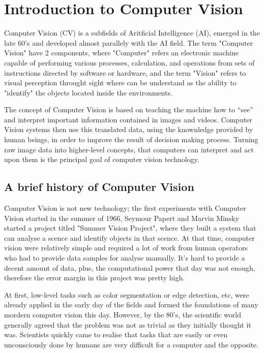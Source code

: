 \documentclass[12pt]{report}
\begin{document}
\newpage

\section{Introduction to Computer Vision}
Computer Vision (CV) is a subfields of Aritficial Intelligence (AI), emerged in the
late 60’s and developed almost parallely with the AI field. 
The term "Computer Vision" have 2 components, where "Computer" refers an electronic 
machine capable of performing various processes, calculation, and operations from 
sets of instructions directed by software or hardware, and the term "Vision" refers
to visual perception throught sight where can be understand as the ability to "identify"
the objects located inside the environments. 

The concept of Computer Vision is based on teaching the machine how to “see” and 
interpret important information contained in images and videos. Computer Vision 
systems then use this translated data, 
using the knownledge provided by human beings, in order to improve the result of 
decision making process. Turning raw image data into higher-level concepts, that 
computers can interpret and act upon them is the principal goal of computer vision 
technology. 

\subsection{A brief history of Computer Vision}
Computer Vision is not new technology; the first experiments with Computer Vision 
started in the summer of 1966, Seymour Papert and Marvin Minsky started a project titled 
"Summer Vision Project"\cite{summervision}, where they built a system that can analyse 
a scence and identify objects in that scence. At that time, computer vision were relatively
simple and required a lot of work from human operators who had to provide data samples 
for analyse manually. It's hard to provide a decent amount of data, plus, the computational
power that day was not enough, therefore the error margin in this project was pretty high. 

At first, low-level tasks such as color segmentation or edge detection, etc, were already 
applied in the early day of the fields and formed the foundations of many mordern computer
vision this day. However, by the 80's, the scientific world generally agreed that the 
problem was not as trivial as they initially thought it was. Scientists quickly came to 
realise that tasks that are easily or even unconsciously done by humans are very difficult 
for a computer and the opposite. 
\end{document}
